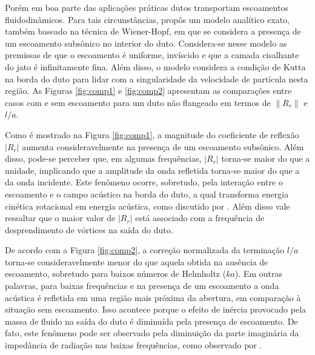 Porém em boa parte das aplicações práticas dutos transportam escoamentos fluidodinâmicos. Para tais circunstâncias,  propôs um modelo analítico exato, também baseado na técnica de Wiener-Hopf, em que se considera a presença de um escoamento subsônico no interior do duto. Considera-se nesse modelo as premissas de que o escoamento é uniforme, invíscido e que a camada cisalhante do jato é infinitamente fina. Além disso, o modelo considera a condição de Kutta na borda do duto para lidar com a singularidade da velocidade de partícula nesta região. As Figuras \ref{fig:comp1} e \ref{fig:comp2} apresentam as comparações entre casos com e sem escoamento para um duto não flangeado em termos de $\|R_{r}\|$ e $l/a$.

\begin{figure}[ht!]
\centering
  
\end{figure}

\newpage
Como é mostrado na Figura \ref{fig:comp1}, a magnitude do coeficiente de reflexão $|R_{r}|$ aumenta consideravelmente na presença de um escoamento subsônico. Além disso, pode-se perceber que, em algumas frequências, $|R_{r}|$ torna-se maior do que a unidade, implicando que a amplitude da onda refletida torna-se maior do que a da onda incidente. Este fenômeno ocorre, sobretudo, pela interação entre o escoamento e o campo acústico na borda do duto, a qual transforma energia cinética rotacional em energia acústica, como discutido por . Além disso vale ressaltar que o maior valor de $|R_{r}|$ está associado com a frequência de desprendimento de vórtices na saída do duto.

\begin{figure}[ht!]
\centering
  
\end{figure}

\newpage
De acordo com a Figura \ref{fig:comp2}, a correção normalizada da terminação $l/a$ torna-se consideravelmente menor do que aquela obtida na ausência de escoamento, sobretudo para baixos números de Helmholtz ($ka$). Em outras palavras, para baixas frequências e na presença de um escoamento a onda acústica é refletida em uma região mais próxima da abertura, em comparação à situação sem escoamento. Isso acontece porque o efeito de inércia provocado pela massa de fluido na saída do duto é diminuída pela presença de escoamento. De fato, este fenômeno pode ser observado pela diminuição da parte imaginária da impedância de radiação nas baixas frequências, como observado por .

